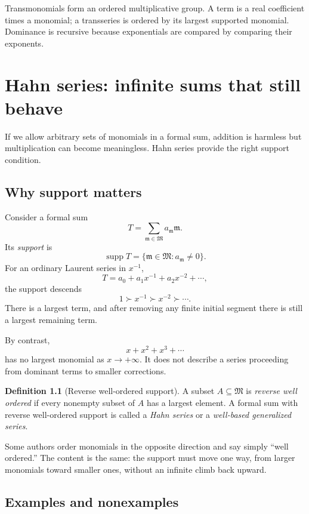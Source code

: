 \documentclass[11pt,openany]{book}
\theoremstyle{definition}
\newtheorem{definition}{Definition}[chapter]
\theoremstyle{plain}
\theoremstyle{remark}
\newcommand{\M}{\mathfrak{M}}
\newcommand{\m}{\mathfrak{m}}
\newcommand{\succdom}{\succ}
\DeclareMathOperator{\supp}{supp}
\begin{document}
\begin{summarybox}
Transmonomials form an ordered multiplicative group. A term is a real coefficient times a monomial; a transseries is ordered by its largest supported monomial. Dominance is recursive because exponentials are compared by comparing their exponents.
\end{summarybox}


\chapter{Hahn series: infinite sums that still behave}\label{ch:hahn}

If we allow arbitrary sets of monomials in a formal sum, addition is harmless but multiplication can become meaningless. Hahn series provide the right support condition.

\section{Why support matters}

Consider a formal sum
\[
 T=\sum_{\m\in\M}a_{\m}\m.
\]
Its \emph{support} is
\[
 \supp T=\{\m\in\M:a_{\m}\ne0\}.
\]
For an ordinary Laurent series in $x^{-1}$,
\[
 T=a_0+a_1x^{-1}+a_2x^{-2}+\cdots,
\]
the support descends
\[
 1\succdom x^{-1}\succdom x^{-2}\succdom\cdots.
\]
There is a largest term, and after removing any finite initial segment there is still a largest remaining term.

By contrast,
\[
 x+x^2+x^3+\cdots
\]
has no largest monomial as $x\to+\infty$. It does not describe a series proceeding from dominant terms to smaller corrections.

\begin{definition}[Reverse well-ordered support]
A subset $A\subseteq\M$ is \emph{reverse well ordered} if every nonempty subset of $A$ has a largest element. A formal sum with reverse well-ordered support is called a \emph{Hahn series} or a \emph{well-based generalized series}.
\end{definition}

Some authors order monomials in the opposite direction and say simply ``well ordered.'' The content is the same: the support must move one way, from larger monomials toward smaller ones, without an infinite climb back upward.

\section{Examples and nonexamples}
\end{document}
